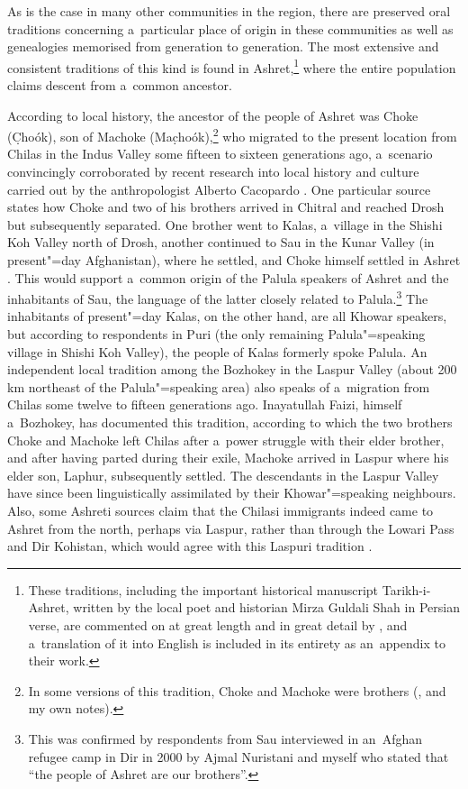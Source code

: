 \largerpage[-1]
As is the case in many other communities in the region, there are preserved oral traditions concerning a~particular place of origin in these communities as well as genealogies memorised from generation to generation. The most extensive and consistent traditions of this kind is found in Ashret,\footnote{These traditions, including the important historical manuscript Tarikh-i-Ashret, written by the local poet and historian Mirza Guldali Shah in Persian verse, are commented on at great length and in great detail by \citet[79--143]{cacopardo2001}, and a~translation of it into English is included in its entirety as an~appendix to their work.} where the entire population claims descent from a~common ancestor. 


According to local history, the ancestor of the people of Ashret was Choke (C̣hoók), son of
Machoke (Mac̣hoók),\footnote{In some versions of this tradition, Choke and Machoke were brothers
  (\citealt[85]{cacopardo2001}, and my own notes).} who migrated to the present location from
Chilas in the Indus Valley some fifteen to sixteen generations ago, a~scenario convincingly corroborated by
recent research into local history and culture carried out by the anthropologist Alberto Cacopardo
\citep[84--93]{cacopardo2001}. One particular source states how Choke and two of his brothers
arrived in Chitral and reached Drosh but subsequently separated. One brother went to Kalas,
a~village in the Shishi Koh Valley north of Drosh, another continued to Sau in the Kunar Valley (in
present"=day Afghanistan), where he settled, and Choke himself settled in Ashret
\citep[84]{cacopardo2001}. This would support a~common origin of the Palula speakers of Ashret and
the inhabitants of Sau, the language of the latter closely related to Palula.\footnote{This was
  confirmed by respondents from Sau interviewed in an~Afghan refugee camp in Dir in 2000 by Ajmal
  Nuristani and myself who stated that ``the people of Ashret are our brothers''.} The inhabitants
of present"=day Kalas, on the other hand, are all Khowar speakers, but according to respondents in
Puri (the only remaining Palula"=speaking village in Shishi Koh Valley), the people of Kalas formerly
spoke Palula. An independent local tradition among the Bozhokey in the Laspur Valley (about 200 km
northeast of the Palula"=speaking area) also speaks of a~migration from Chilas some twelve to fifteen
generations ago. Inayatullah Faizi, himself a~Bozhokey, has documented this tradition, according
to which the two brothers Choke and Machoke left Chilas after a~power struggle with their elder
brother, and after having parted during their exile, Machoke arrived in Laspur where his elder son,
Laphur, subsequently settled. The descendants in the Laspur Valley have since been linguistically
assimilated by their Khowar"=speaking neighbours. Also, some Ashreti sources claim that the Chilasi
immigrants indeed came to Ashret from the north, perhaps via Laspur, rather than through the Lowari
Pass and Dir Kohistan, which would agree with this Laspuri tradition \citep[85, 125--126]{cacopardo2001}.


